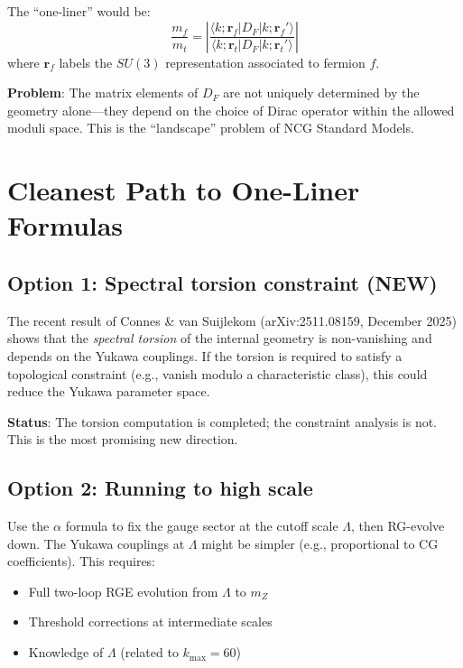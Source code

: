 \documentclass[11pt,a4paper]{article}
\begin{document}
The ``one-liner'' would be:
\begin{equation}
\frac{m_f}{m_t} = \left|\frac{\langle k; \mathbf{r}_f | D_F | k; \mathbf{r}_f' \rangle}{\langle k; \mathbf{r}_t | D_F | k; \mathbf{r}_t' \rangle}\right|
\end{equation}
where $\mathbf{r}_f$ labels the $SU(3)$ representation associated to fermion $f$.

\textbf{Problem}: The matrix elements of $D_F$ are not uniquely determined by the geometry alone---they depend on the choice of Dirac operator within the allowed moduli space. This is the ``landscape'' problem of NCG Standard Models.

\section{Cleanest Path to One-Liner Formulas}

\subsection{Option 1: Spectral torsion constraint (NEW)}

The recent result of Connes \& van Suijlekom (arXiv:2511.08159, December 2025) shows that the \emph{spectral torsion} of the internal geometry is non-vanishing and depends on the Yukawa couplings. If the torsion is required to satisfy a topological constraint (e.g., vanish modulo a characteristic class), this could reduce the Yukawa parameter space.

\textbf{Status}: The torsion computation is completed; the constraint analysis is not. This is the most promising new direction.

\subsection{Option 2: Running to high scale}

Use the $\alpha$ formula to fix the gauge sector at the cutoff scale $\Lambda$, then RG-evolve down. The Yukawa couplings at $\Lambda$ might be simpler (e.g., proportional to CG coefficients). This requires:
\begin{itemize}
\item Full two-loop RGE evolution from $\Lambda$ to $m_Z$
\item Threshold corrections at intermediate scales
\item Knowledge of $\Lambda$ (related to $k_{\max} = 60$)
\end{itemize}
\end{document}
